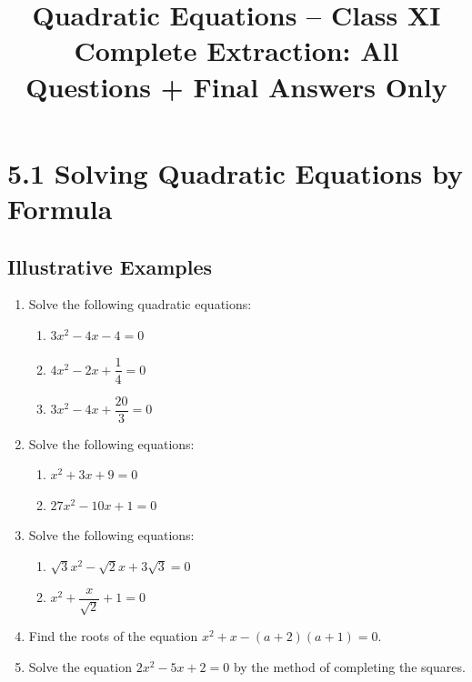 \documentclass[12pt,a4paper]{article}
\title{\textbf{Quadratic Equations -- Class XI}\\[0.4cm]
\large Complete Extraction: All Questions + Final Answers Only}
\author{}
\date{}
\begin{document}
\maketitle
\tableofcontents
\newpage

\section{5.1 Solving Quadratic Equations by Formula}

\subsection{Illustrative Examples}

\begin{enumerate}[label=Example \arabic*.]
    \item Solve the following quadratic equations:
    \begin{enumerate}[label=(\roman*)]
        \item \( 3x^2 - 4x - 4 = 0 \)
        \item \( 4x^2 - 2x + \dfrac{1}{4} = 0 \)
        \item \( 3x^2 - 4x + \dfrac{20}{3} = 0 \)
    \end{enumerate}

    \item Solve the following equations:
    \begin{enumerate}[label=(\roman*)]
        \item \( x^2 + 3x + 9 = 0 \)
        \item \( 27x^2 - 10x + 1 = 0 \)
    \end{enumerate}

    \item Solve the following equations:
    \begin{enumerate}[label=(\roman*)]
        \item \( \sqrt{3}x^2 - \sqrt{2}x + 3\sqrt{3} = 0 \)
        \item \( x^2 + \dfrac{x}{\sqrt{2}} + 1 = 0 \)
    \end{enumerate}

    \item Find the roots of the equation \( x^2 + x - (a + 2)(a + 1) = 0 \).

    \item Solve the equation \( 2x^2 - 5x + 2 = 0 \) by the method of completing the squares.


\end{enumerate}
\end{document}
